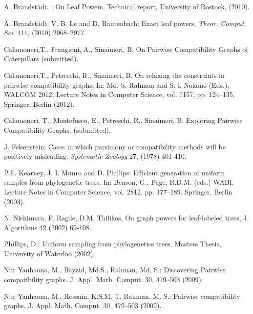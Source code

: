 \documentclass[review]{elsarticle}
\begin{document}
\begin{thebibliography}{99}

\begin{small}


A. Brandst\"adt. : On Leaf Powers. Technical report, University of Rostock, (2010).

A. Brandst{\"a}dt, V. B. Le and  D. Rautenbach: Exact leaf powers, {\em Theor. Comput. Sci.} 411, (2010) 2968--2977.







Calamoneri,T., Frangioni, A., Sinaimeri, B. On Pairwise Compatibility Graphs of Caterpillars (submitted).

Calamoneri,T., Petreschi, R., Sinaimeri, B. On relaxing the constraints in 
pairwise compatibility graphs, In: Md. S. Rahman and S.-i. Nakano (Eds.), WALCOM 2012, Lecture Notes in Computer Science, vol. 7157, pp. 124--135, Springer, Berlin (2012).

Calamoneri, T., Montefusco, E., Petreschi, R., Sinaimeri, B. Exploring Pairwise Compatibility Graphs. (submitted).

J. Felsenstein: Cases in which parsimony or compatibility methods will be positively misleading. {\em Systematic Zoology} 27,  (1978) 401-410.









P.E. Kearney, J. I. Munro and D. Phillips: Efficient generation of uniform samples from phylogenetic trees. In: Benson, G., Page, R.D.M. (eds.) WABI. Lecture Notes in Computer Science, vol. 2812, pp. 177--189. Springer, Berlin (2003).




N. Nishimura, P. Ragde, D.M. Thilikos, On graph powers for leaf-labeled trees, J. Algorithms 42 (2002) 69-108.

Phillips, D.: Uniform sampling from phylogenetics trees. Masters Thesis, University of Waterloo (2002).

Nur Yanhaona, M., Bayzid, Md.S., Rahman, Md. S.: Discovering Pairwise compatibility graphs. J. Appl. Math. Comput. 30, 479--503 (2009).

Nur Yanhaona, M., Hossain, K.S.M. T. Rahman, M. S.: Pairwise compatibility graphs. J. Appl. Math. Comput. 30, 479--503 (2009).




\end{small}
\end{thebibliography}
\end{document}
